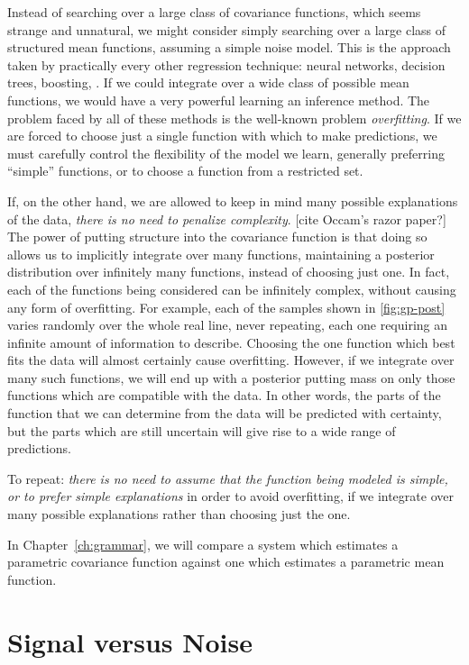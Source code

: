 Instead of searching over a large class of covariance functions, which seems strange and unnatural, we might consider simply searching over a large class of structured mean functions, assuming a simple \iid noise model.
This is the approach taken by practically every other regression technique: neural networks, decision trees, boosting, \etc.
If we could integrate over a wide class of possible mean functions, we would have a very powerful learning an inference method.
The problem faced by all of these methods is the well-known problem \emph{overfitting}.
If we are forced to choose just a single function with which to make predictions, we must carefully control the flexibility of the model we learn, generally preferring ``simple'' functions, or to choose a function from a restricted set.

If, on the other hand, we are allowed to keep in mind many possible explanations of the data, \emph{there is no need to penalize complexity}. [cite Occam's razor paper?]
The power of putting structure into the covariance function is that doing so allows us to implicitly integrate over many functions, maintaining a posterior distribution over infinitely many functions, instead of choosing just one.
In fact, each of the functions being considered can be infinitely complex, without causing any form of overfitting.
For example, each of the samples shown in \cref{fig:gp-post} varies randomly over the whole real line, never repeating, each one requiring an infinite amount of information to describe.
Choosing the one function which best fits the data will almost certainly cause overfitting.
However, if we integrate over many such functions, we will end up with a posterior putting mass on only those functions which are compatible with the data.
In other words, the parts of the function that we can determine from the data will be predicted with certainty, but the parts which are still uncertain will give rise to a wide range of predictions.

To repeat: \emph{there is no need to assume that the function being modeled is simple, or to prefer simple explanations} in order to avoid overfitting, if we integrate over many possible explanations rather than choosing just the one.

In Chapter~\ref{ch:grammar}, we will compare a system which estimates a parametric covariance function against one which estimates a parametric mean function.


\section{Signal versus Noise}

